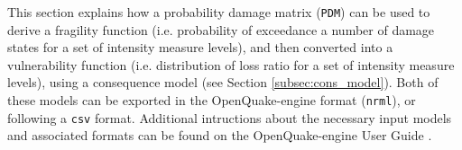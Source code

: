 This section explains how a probability damage matrix (\verb=PDM=) can be used to derive a fragility function (i.e. probability of exceedance a number of
damage states for a set of intensity measure levels), and then converted into a vulnerability function  (i.e. distribution of loss ratio for a set of intensity measure levels), using a consequence model (see Section \ref{subsec:cons_model}). Both of these models can be exported in the OpenQuake-engine format (\verb=nrml=), or following a \verb=csv= format. Additional intructions about the necessary input models and associated formats can be found on the OpenQuake-engine User Guide \citep{GEM2015}.\\
